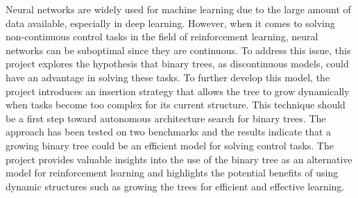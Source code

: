 
Neural networks are widely used for machine learning due to the large amount of data available, especially in deep learning. However, when it comes to solving non-continuous control tasks in the field of reinforcement learning, neural networks can be suboptimal since they are continuous. To address this issue, this project explores the hypothesis that binary trees, as discontinuous models, could have an advantage in solving these tasks. To further develop this model, the project introduces an insertion strategy that allows the tree to grow dynamically when tasks become too complex for its current structure. This technique should be a first step toward autonomous architecture search for binary trees. The approach has been tested on two benchmarks and the results indicate that a growing binary tree could be an efficient model for solving control tasks. The project provides valuable insights into the use of the binary tree as an alternative model for reinforcement learning and highlights the potential benefits of using dynamic structures such as growing the trees for efficient and effective learning.